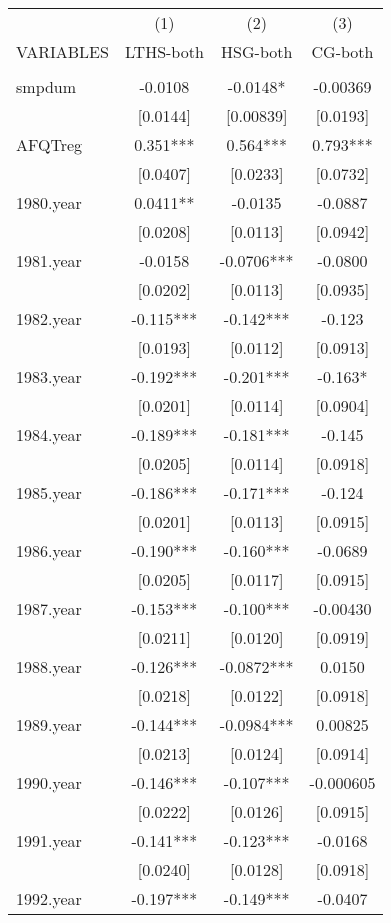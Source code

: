 \documentclass[]{article}
\begin{document}
\begin{tabular}{lccc} \hline
 & (1) & (2) & (3) \\
VARIABLES & LTHS-both & HSG-both & CG-both \\ \hline
 &  &  &  \\
smpdum & -0.0108 & -0.0148* & -0.00369 \\
 & [0.0144] & [0.00839] & [0.0193] \\
AFQTreg & 0.351*** & 0.564*** & 0.793*** \\
 & [0.0407] & [0.0233] & [0.0732] \\
1980.year & 0.0411** & -0.0135 & -0.0887 \\
 & [0.0208] & [0.0113] & [0.0942] \\
1981.year & -0.0158 & -0.0706*** & -0.0800 \\
 & [0.0202] & [0.0113] & [0.0935] \\
1982.year & -0.115*** & -0.142*** & -0.123 \\
 & [0.0193] & [0.0112] & [0.0913] \\
1983.year & -0.192*** & -0.201*** & -0.163* \\
 & [0.0201] & [0.0114] & [0.0904] \\
1984.year & -0.189*** & -0.181*** & -0.145 \\
 & [0.0205] & [0.0114] & [0.0918] \\
1985.year & -0.186*** & -0.171*** & -0.124 \\
 & [0.0201] & [0.0113] & [0.0915] \\
1986.year & -0.190*** & -0.160*** & -0.0689 \\
 & [0.0205] & [0.0117] & [0.0915] \\
1987.year & -0.153*** & -0.100*** & -0.00430 \\
 & [0.0211] & [0.0120] & [0.0919] \\
1988.year & -0.126*** & -0.0872*** & 0.0150 \\
 & [0.0218] & [0.0122] & [0.0918] \\
1989.year & -0.144*** & -0.0984*** & 0.00825 \\
 & [0.0213] & [0.0124] & [0.0914] \\
1990.year & -0.146*** & -0.107*** & -0.000605 \\
 & [0.0222] & [0.0126] & [0.0915] \\
1991.year & -0.141*** & -0.123*** & -0.0168 \\
 & [0.0240] & [0.0128] & [0.0918] \\
1992.year & -0.197*** & -0.149*** & -0.0407 \\

\end{tabular}
\end{document}
